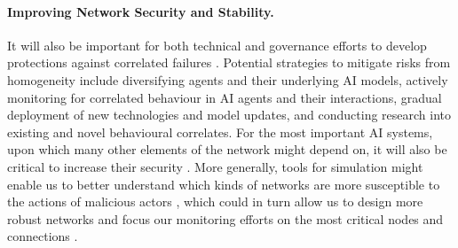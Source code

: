 \paragraph{Improving Network Security and Stability.}
It will also be important for both technical and governance efforts to develop {protections against correlated failures} \citep{Maas2018}.
Potential strategies to mitigate risks from homogeneity include diversifying agents and their underlying AI models, actively monitoring for correlated behaviour in AI agents and their interactions, gradual deployment of new technologies and model updates, and conducting research into existing and novel behavioural correlates.
For the most important AI systems, upon which many other elements of the network might depend on, it will also be critical to increase their security \citep[see also ]{Schmidt2022AIGP,Steimers2022Sources}.
More generally, tools for simulation might enable us to better understand which kinds of networks are more susceptible to the actions of malicious actors \citep{Tian2023,Huang2024,Yu2024}, which could in turn allow us to design more robust networks and focus our monitoring efforts on the most critical nodes and connections \citep{Barbi2025}.
